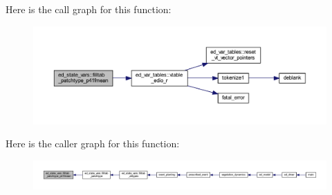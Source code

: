 Here is the call graph for this function\+:\nopagebreak
\begin{figure}[H]
\begin{center}
\leavevmode
\includegraphics[width=350pt]{namespaceed__state__vars_a308bf007a232ca65383f36dd6fbd0084_cgraph}
\end{center}
\end{figure}




Here is the caller graph for this function\+:\nopagebreak
\begin{figure}[H]
\begin{center}
\leavevmode
\includegraphics[width=350pt]{namespaceed__state__vars_a308bf007a232ca65383f36dd6fbd0084_icgraph}
\end{center}
\end{figure}


